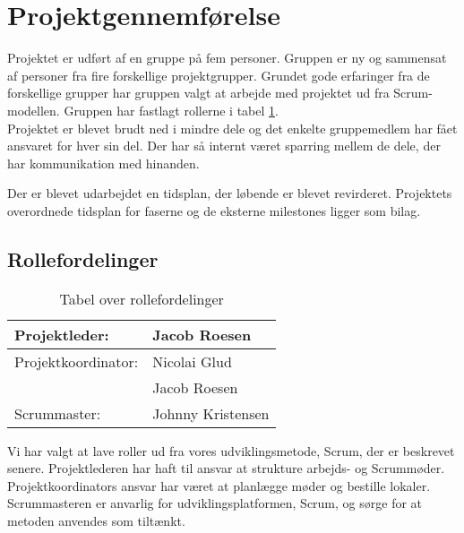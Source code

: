 \section{Projektgennemførelse}
Projektet er udført af en gruppe på fem personer. Gruppen er ny og sammensat af personer fra fire forskellige projektgrupper. Grundet gode erfaringer fra de forskellige grupper har gruppen valgt at arbejde med projektet ud fra Scrum-modellen. Gruppen har fastlagt rollerne i tabel \ref{table:roller}. \\
Projektet er blevet brudt ned i mindre dele og det enkelte gruppemedlem har fået ansvaret for hver sin del. Der har så internt været sparring mellem de dele, der har kommunikation med hinanden.

Der er blevet udarbejdet en tidsplan, der løbende er blevet revirderet. Projektets overordnede tidsplan for faserne og de eksterne milestones ligger som bilag.\\

\subsection{Rollefordelinger}
\begin{table}[H]
\centering
\begin{tabular}{|l|l|} \hline
Projektleder: &Jacob Roesen\\\hline
Projektkoordinator: &Nicolai Glud\\
	&Jacob Roesen\\\hline
Scrummaster: &Johnny Kristensen\\\hline
\end{tabular}
\caption{Tabel over rollefordelinger}
\label{table:roller}
\end{table}
Vi har valgt at lave roller ud fra vores udviklingsmetode, Scrum, der er beskrevet senere. Projektlederen har haft til ansvar at strukture arbejds- og Scrummøder. Projektkoordinators ansvar har været at planlægge møder og bestille lokaler. Scrummasteren er anvarlig for udviklingsplatformen, Scrum, og sørge for at metoden anvendes som tiltænkt. 